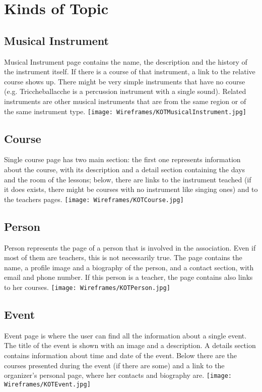 \documentclass[../../DD.tex]{subfiles}
\begin{document}
\section{Kinds of Topic \label{sect:2.1}}
	\subsection{Musical Instrument}
		Musical Instrument page contains the name, the description and the history of the instrument itself. If there is a course of that instrument, a link to the relative course shows up. There might be very simple instruments that have no course (e.g. Triccheballacche is a percussion instrument with a single sound). Related instruments are other musical instruments that are from the same region or of the same instrument type.
		\newline
		\texttt{[image: Wireframes/KOTMusicalInstrument.jpg]}

	\subsection{Course}
		Single course page has two main section: the first one represents information about the course, with its description and a detail section containing the days and the room of the lessons; below, there are links to the instrument teached (if it does exists, there might be courses with no instrument like singing ones) and to the teachers pages.  
		\newline
		\texttt{[image: Wireframes/KOTCourse.jpg]}

	\subsection{Person}
		Person represents the page of a person that is involved in the association. Even if most of them are teachers, this is not necessarily true. The page contains the name, a profile image and a biography of the person, and a contact section, with email and phone number. If this person is a teacher, the page contains also links to her courses.
		\newline
		\texttt{[image: Wireframes/KOTPerson.jpg]}

	\subsection{Event}
		Event page is where the user can find all the information about a single event. The title of the event is shown with an image and a description. A details section contains information about time and date of the event. Below there are the courses presented during the event (if there are some) and a link to the organizer's personal page, where her contacts and biography are.
		\newline
		\texttt{[image: Wireframes/KOTEvent.jpg]}
\end{document}
